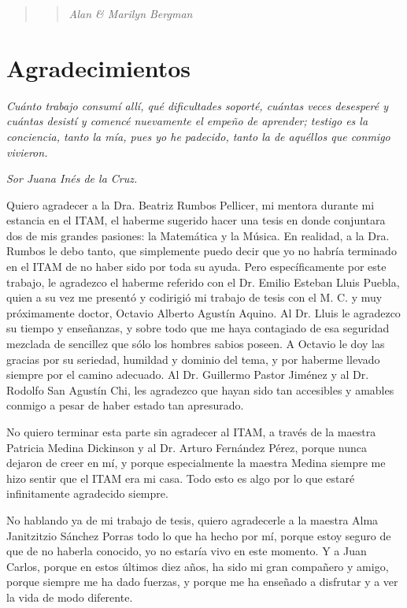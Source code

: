 \documentclass[letterpaper,12pt]{book}
\theoremstyle{definition} \newtheorem{Def}{Definición}[chapter]
\theoremstyle{definition} \newtheorem{Teo}{Teorema}[chapter]
\theoremstyle{definition} \newtheorem{Pro}{Proposición}[chapter]
\theoremstyle{definition} \newtheorem{Lema}{Lema}[chapter]
\begin{document}
\begin{quote}
\begin{verse}
\textit{Alan \& Marilyn Bergman}
\end{verse}
\end{quote}

\tableofcontents

\chapter{Agradecimientos}

{\footnotesize
\textit{Cuánto trabajo consumí allí, qué dificultades soporté, cuántas veces desesperé y cuántas desistí y comencé nuevamente el empeño de aprender; testigo es la conciencia, tanto la mía, pues yo he padecido, tanto la de aquéllos que conmigo vivieron.} 
\begin{flushright}
\textit{Sor Juana Inés de la Cruz.}
\end{flushright}
}
Quiero agradecer a la Dra. Beatriz Rumbos Pellicer, mi mentora durante mi estancia en el ITAM, el haberme sugerido hacer una tesis en donde conjuntara dos de mis grandes pasiones: la Matemática y la Música. En realidad, a la Dra. Rumbos le debo tanto, que simplemente puedo decir que yo no habría terminado en el ITAM de no haber sido por toda su ayuda. Pero específicamente por este trabajo, le agradezco el haberme referido con el Dr. Emilio Esteban Lluis Puebla, quien a su vez me presentó y codirigió mi trabajo de tesis con el M. C. y muy próximamente doctor, Octavio Alberto Agustín Aquino. Al Dr. Lluis le agradezco su tiempo y enseñanzas, y sobre todo que me haya contagiado de esa seguridad mezclada de sencillez que sólo los hombres sabios poseen. A Octavio le doy las gracias por su seriedad, humildad y dominio del tema, y por haberme llevado siempre por el camino adecuado. Al Dr. Guillermo Pastor Jiménez y al Dr. Rodolfo San Agustín Chi, les agradezco que hayan sido tan accesibles y amables conmigo a pesar de haber estado tan apresurado.

No quiero terminar esta parte sin agradecer al ITAM, a través de la maestra Patricia Medina Dickinson y al Dr. Arturo Fernández Pérez, porque nunca dejaron de creer en mí, y porque especialmente la maestra Medina siempre me hizo sentir que el ITAM era mi casa. Todo esto es algo por lo que estaré infinitamente agradecido siempre. 

No hablando ya de mi trabajo de tesis, quiero agradecerle a la maestra Alma Janitzitzio Sánchez Porras todo lo que ha hecho por mí, porque estoy seguro de que de no haberla conocido, yo no estaría vivo en este momento. Y a Juan Carlos, porque en estos últimos diez años, ha sido mi gran compañero y amigo, porque siempre me ha dado fuerzas, y porque me ha enseñado a disfrutar y a ver la vida de modo diferente. 
\end{document}
